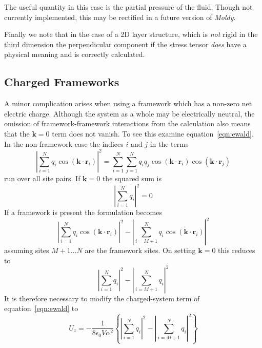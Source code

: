 \documentclass[a4paper,twoside]{report}
\providecommand{\bm}[1]{\mathbf{#1}}
\newcommand{\moldy}{\emph{Moldy}}
\begin{document}
The useful quantity in this case is the partial pressure of the
fluid.  Though not currently implemented, this may be rectified in a
future version of \moldy.

Finally we note that in the case of a 2D layer structure, which is
\emph{not} rigid in the third dimension the perpendicular component if
the stress tensor \emph{does} have a physical meaning and is correctly
calculated. 
 
\subsection{Charged Frameworks}
A minor complication arises when using a framework which has a
non-zero net electric charge.  Although the system as a whole may be
electrically neutral, the omission of  framework-framework
interactions from the calculation also means that the
$\bm{k}=0$ term does not vanish.  To see this examine
equation~\ref{eqn:ewald}.  In the non-framework case the indices $i$
and $j$ in the terms
\begin{displaymath}
\left | \sum_{i=1}^{N} q_i \cos(\bm{k \cdot r}_i) \right |^2 
  = \sum_{i=1}^{N} \sum_{j=1}^{N} q_i q_j 
    \cos(\bm{k \cdot r}_i)\cos(\bm{k \cdot r}_j) 
\end{displaymath}
run over all site pairs.  If $\bm{k}=0$
the squared sum is 
\begin{displaymath}
\left | \sum_{i=1}^{N} q_i \right |^2 = 0
\end{displaymath}
If a framework is present the formulation becomes
\begin{displaymath}
\left | \sum_{i=1}^{N} q_i \cos(\bm{k \cdot r}_i) \right |^2 
-
\left | \sum_{i=M\!+\!1}^{N} q_i \cos(\bm{k \cdot r}_i) \right |^2 
\end{displaymath}
assuming sites $M+1 \ldots N$ are the framework sites.  On setting
$\bm{k}=0$ this reduces to
\begin{displaymath}
\left | \sum_{i=1}^N q_i \right |^2 - \left | \sum_{i=M\!+\!1}^N q_i \right |^2
\end{displaymath}
It is therefore necessary to modify the charged-system term of
equation~\ref{eqn:ewald} to
\begin{equation}
U_z = - \frac{1}{8 \epsilon_0 V \alpha^2}
\left \lbrace
\left | \sum_{i=1}^N q_i \right |^2 - \left | \sum_{i=M\!+\!1}^N q_i \right |^2
\right \rbrace
\end{equation}
\end{document}
